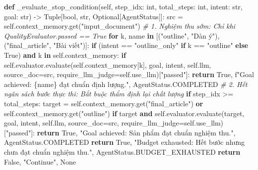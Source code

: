 \documentclass[]{article}
\newenvironment{Shaded}{}{}
\newcommand{\BuiltInTok}[1]{#1}
\newcommand{\CommentTok}[1]{\textcolor[rgb]{0.38,0.63,0.69}{\textit{#1}}}
\newcommand{\ControlFlowTok}[1]{\textcolor[rgb]{0.00,0.44,0.13}{\textbf{#1}}}
\newcommand{\KeywordTok}[1]{\textcolor[rgb]{0.00,0.44,0.13}{\textbf{#1}}}
\newcommand{\NormalTok}[1]{#1}
\newcommand{\OperatorTok}[1]{\textcolor[rgb]{0.40,0.40,0.40}{#1}}
\newcommand{\SpecialCharTok}[1]{\textcolor[rgb]{0.25,0.44,0.63}{#1}}
\newcommand{\SpecialStringTok}[1]{\textcolor[rgb]{0.73,0.40,0.53}{#1}}
\newcommand{\StringTok}[1]{\textcolor[rgb]{0.25,0.44,0.63}{#1}}
\newcommand{\VariableTok}[1]{\textcolor[rgb]{0.10,0.09,0.49}{#1}}
\begin{document}
\begin{Shaded}
\begin{Highlighting}[]
    \KeywordTok{def}\NormalTok{ _evaluate_stop_condition(}\VariableTok{self}\NormalTok{, step_idx: }\BuiltInTok{int}\NormalTok{, total_steps: }\BuiltInTok{int}\NormalTok{, intent: }\BuiltInTok{str}\NormalTok{, goal: }\BuiltInTok{str}\NormalTok{) }\OperatorTok{->}\NormalTok{ Tuple[}\BuiltInTok{bool}\NormalTok{, }\BuiltInTok{str}\NormalTok{, Optional[AgentStatus]]:}
\NormalTok{        src }\OperatorTok{=} \VariableTok{self}\NormalTok{.context_memory.get(}\StringTok{"input_document"}\NormalTok{)}
        \CommentTok{# 1. Nghiệm thu sớm: Chỉ khi QualityEvaluator.passed == True}
        \ControlFlowTok{for}\NormalTok{ k, name }\KeywordTok{in}\NormalTok{ [(}\StringTok{"outline"}\NormalTok{, }\StringTok{"Dàn ý"}\NormalTok{), (}\StringTok{"final_article"}\NormalTok{, }\StringTok{"Bài viết"}\NormalTok{)]:}
            \ControlFlowTok{if}\NormalTok{ (intent }\OperatorTok{==} \StringTok{"outline_only"} \ControlFlowTok{if}\NormalTok{ k }\OperatorTok{==} \StringTok{"outline"} \ControlFlowTok{else} \VariableTok{True}\NormalTok{) }\KeywordTok{and}\NormalTok{ k }\KeywordTok{in} \VariableTok{self}\NormalTok{.context_memory:}
                \ControlFlowTok{if} \VariableTok{self}\NormalTok{.evaluator.evaluate(}\VariableTok{self}\NormalTok{.context_memory[k], goal, intent, }\VariableTok{self}\NormalTok{.llm, source_doc}\OperatorTok{=}\NormalTok{src, require_llm_judge}\OperatorTok{=}\VariableTok{self}\NormalTok{.use_llm)[}\StringTok{"passed"}\NormalTok{]:}
                    \ControlFlowTok{return} \VariableTok{True}\NormalTok{, }\SpecialStringTok{f"Goal achieved: }\SpecialCharTok{\{}\NormalTok{name}\SpecialCharTok{\}}\SpecialStringTok{ đạt chuẩn định lượng."}\NormalTok{, AgentStatus.COMPLETED}
        \CommentTok{# 2. Hết ngân sách bước thực thi: Bắt buộc thẩm định lại chất lượng}
        \ControlFlowTok{if}\NormalTok{ step_idx }\OperatorTok{>=}\NormalTok{ total_steps:}
\NormalTok{            target }\OperatorTok{=} \VariableTok{self}\NormalTok{.context_memory.get(}\StringTok{"final_article"}\NormalTok{) }\KeywordTok{or} \VariableTok{self}\NormalTok{.context_memory.get(}\StringTok{"outline"}\NormalTok{)}
            \ControlFlowTok{if}\NormalTok{ target }\KeywordTok{and} \VariableTok{self}\NormalTok{.evaluator.evaluate(target, goal, intent, }\VariableTok{self}\NormalTok{.llm, source_doc}\OperatorTok{=}\NormalTok{src, require_llm_judge}\OperatorTok{=}\VariableTok{self}\NormalTok{.use_llm)[}\StringTok{"passed"}\NormalTok{]:}
                \ControlFlowTok{return} \VariableTok{True}\NormalTok{, }\StringTok{"Goal achieved: Sản phẩm đạt chuẩn nghiệm thu."}\NormalTok{, AgentStatus.COMPLETED}
            \ControlFlowTok{return} \VariableTok{True}\NormalTok{, }\StringTok{"Budget exhausted: Hết bước nhưng chưa đạt chuẩn nghiệm thu."}\NormalTok{, AgentStatus.BUDGET_EXHAUSTED}
        \ControlFlowTok{return} \VariableTok{False}\NormalTok{, }\StringTok{"Continue"}\NormalTok{, }\VariableTok{None}
\end{Highlighting}
\end{Shaded}
\end{document}
